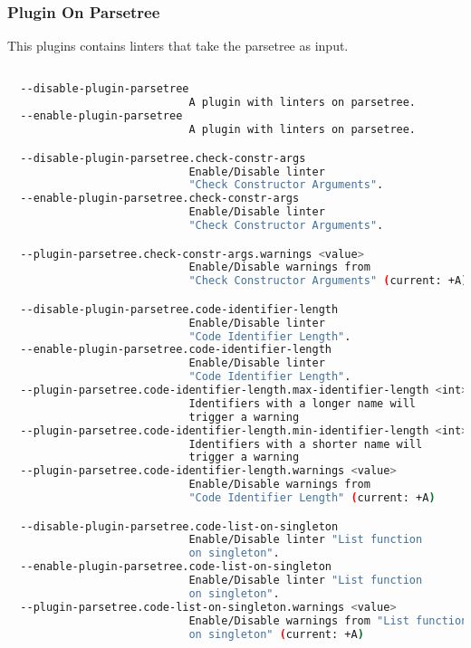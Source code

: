 \subsubsection*{Plugin On Parsetree}
This plugins contains linters that take the parsetree as input.

\begin{lstlisting}[language=bash,basicstyle=\tt\small,showspaces=false,showstringspaces=false]

  --disable-plugin-parsetree  
                            A plugin with linters on parsetree.
  --enable-plugin-parsetree  
                            A plugin with linters on parsetree.

  --disable-plugin-parsetree.check-constr-args  
                            Enable/Disable linter 
                            "Check Constructor Arguments".
  --enable-plugin-parsetree.check-constr-args  
                            Enable/Disable linter 
                            "Check Constructor Arguments".

  --plugin-parsetree.check-constr-args.warnings <value> 
                            Enable/Disable warnings from 
                            "Check Constructor Arguments" (current: +A)

  --disable-plugin-parsetree.code-identifier-length  
                            Enable/Disable linter 
                            "Code Identifier Length".
  --enable-plugin-parsetree.code-identifier-length  
                            Enable/Disable linter 
                            "Code Identifier Length".
  --plugin-parsetree.code-identifier-length.max-identifier-length <int> 
                            Identifiers with a longer name will 
                            trigger a warning
  --plugin-parsetree.code-identifier-length.min-identifier-length <int> 
                            Identifiers with a shorter name will 
                            trigger a warning
  --plugin-parsetree.code-identifier-length.warnings <value> 
                            Enable/Disable warnings from 
                            "Code Identifier Length" (current: +A)

  --disable-plugin-parsetree.code-list-on-singleton  
                            Enable/Disable linter "List function 
                            on singleton".
  --enable-plugin-parsetree.code-list-on-singleton  
                            Enable/Disable linter "List function 
                            on singleton".
  --plugin-parsetree.code-list-on-singleton.warnings <value> 
                            Enable/Disable warnings from "List function 
                            on singleton" (current: +A)


\end{lstlisting}
